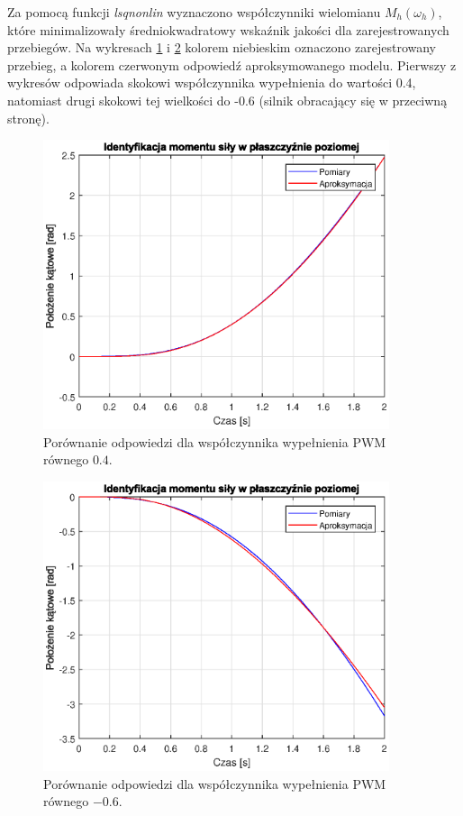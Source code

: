 \documentclass[11pt,a4paper]{article}
\begin{document}
Za pomocą funkcji \textit{lsqnonlin} wyznaczono współczynniki wielomianu \(M_h(\omega_h)\), które minimalizowały średniokwadratowy wskaźnik jakości dla zarejestrowanych przebiegów. Na wykresach \ref{fig:ident_M_h_04} i \ref{fig:ident_M_h_-06} kolorem niebieskim oznaczono zarejestrowany przebieg, a kolorem czerwonym odpowiedź aproksymowanego modelu. Pierwszy z wykresów odpowiada skokowi współczynnika wypełnienia do wartości 0.4, natomiast drugi skokowi tej wielkości do -0.6 (silnik obracający się w przeciwną stronę).

\begin{figure}[H]
	\centering
	\includegraphics[width=4in]{Figures/ident_M_h_04.eps}
	\caption{Porównanie odpowiedzi dla współczynnika wypełnienia PWM równego \(0.4\).}
	\label{fig:ident_M_h_04}
\end{figure}

\begin{figure}[H]
	\centering
	\includegraphics[width=4in]{Figures/ident_M_h_-06.eps}
	\caption{Porównanie odpowiedzi dla współczynnika wypełnienia PWM równego \(-0.6\).}
	\label{fig:ident_M_h_-06}
\end{figure}
\end{document}
